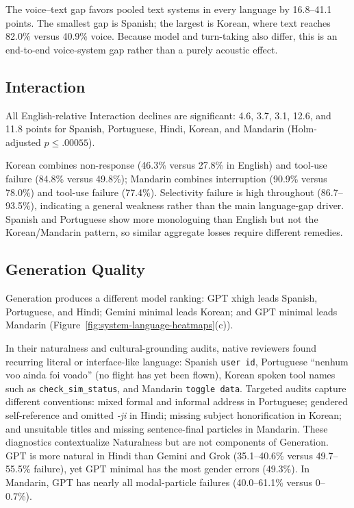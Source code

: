 \documentclass{article}
\begin{document}
The voice--text gap favors pooled text systems in every language by
16.8--41.1 points. The smallest gap is Spanish; the largest is Korean, where
text reaches 82.0\% versus 40.9\% voice.
Because model and turn-taking also
differ, this is an end-to-end voice-system gap rather than a purely acoustic
effect.

\subsection{Interaction}
\label{sec:results-interaction}

All English-relative Interaction declines are significant: 4.6, 3.7, 3.1,
12.6, and 11.8 points for Spanish, Portuguese, Hindi, Korean, and Mandarin
(Holm-adjusted $p\leq.00055$).

Korean combines non-response (46.3\% versus 27.8\% in English) and tool-use
failure (84.8\% versus 49.8\%); Mandarin combines interruption (90.9\% versus
78.0\%) and tool-use failure (77.4\%). Selectivity failure is high throughout
(86.7--93.5\%), indicating a general weakness rather than the main language-gap
driver. Spanish and Portuguese show more monologuing than English but not the
Korean/Mandarin pattern, so similar aggregate losses require different
remedies.


\subsection{Generation Quality}
\label{sec:results-generation}

Generation produces a different model ranking: GPT xhigh leads Spanish,
Portuguese, and Hindi; Gemini minimal leads Korean; and GPT minimal leads
Mandarin (Figure~\ref{fig:system-language-heatmaps}(c)).

In their naturalness and cultural-grounding audits, native reviewers found
recurring literal or interface-like language: Spanish
\texttt{user id}, Portuguese ``nenhum voo ainda foi voado'' (no flight has yet
been flown), Korean spoken tool names such as
\texttt{check\_sim\_status}, and Mandarin \texttt{toggle data}. Targeted audits
capture different conventions: mixed formal and informal address in Portuguese;
gendered self-reference and omitted \emph{-ji} in Hindi; missing subject
honorification in Korean; and unsuitable titles and missing sentence-final
particles in Mandarin. These diagnostics contextualize Naturalness but are not
components of Generation. GPT is more natural in Hindi than Gemini and Grok
(35.1--40.6\% versus 49.7--55.5\% failure), yet GPT minimal has the most gender
errors (49.3\%). In Mandarin, GPT has nearly all modal-particle failures
(40.0--61.1\% versus 0--0.7\%).
\end{document}
